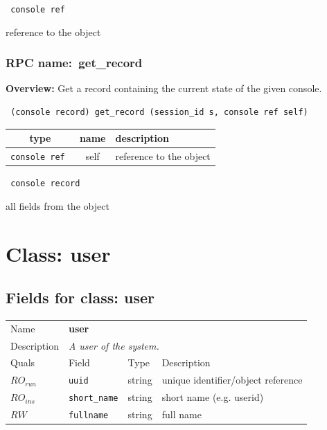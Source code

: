 \vspace{0.3cm}

{\tt 
console ref
}


reference to the object
\vspace{0.3cm}
\vspace{0.3cm}
\vspace{0.3cm}
\subsubsection{RPC name:~get\_record}

{\bf Overview:} 
Get a record containing the current state of the given console.

\begin{verbatim} (console record) get_record (session_id s, console ref self)\end{verbatim}



 
\vspace{0.3cm}
\begin{tabular}{|c|c|p{7cm}|}
 \hline
{\bf type} & {\bf name} & {\bf description} \\ \hline
{\tt console ref } & self & reference to the object \\ \hline 

\end{tabular}

\vspace{0.3cm}

{\tt 
console record
}


all fields from the object
\vspace{0.3cm}
\vspace{0.3cm}
\vspace{0.3cm}

\vspace{1cm}
\newpage
\section{Class: user}
\subsection{Fields for class: user}
\begin{longtable}{|lllp{}|}
\hline
\multicolumn{1}{|l}{Name} & \multicolumn{3}{l|}{\bf user} \\
\multicolumn{1}{|l}{Description} & \multicolumn{3}{l|}{\parbox{11cm}{\em A
user of the system.}} \\
\hline
Quals & Field & Type & Description \\
\hline
$\mathit{RO}_\mathit{run}$ &  {\tt uuid} & string & unique identifier/object reference \\
$\mathit{RO}_\mathit{ins}$ &  {\tt short\_name} & string & short name (e.g. userid) \\
$\mathit{RW}$ &  {\tt fullname} & string & full name \\
\hline
\end{longtable}
